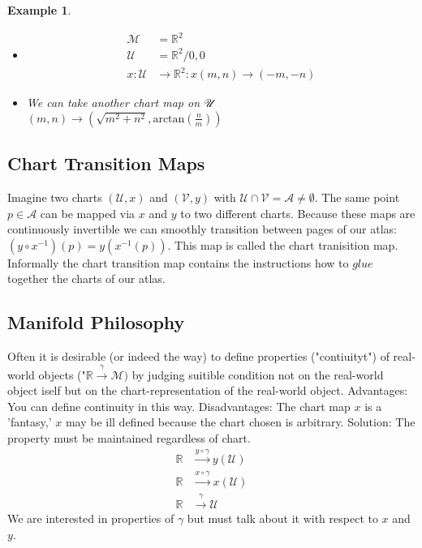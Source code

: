 \documentclass[10pt, oneside]{article}
\newcommand{\R}{\mathbb{R}}
\newcommand{\M}{\mathcal{M}}
\newtheorem{example}{Example}
\begin{document}
         \begin{example}
            \begin{itemize}
               \item \begin{align*}
                  \M &= \R^2 \\
                  \mathcal{U} &= \R^2 \slash {0,0} \\
                  x: \mathcal{U} &\to \R^2 : x(m,n) \to (-m,-n) 
               \end{align*}
               \item We can take another chart map on $\mathcal{U}\\$
            $(m,n) \to (\sqrt{m^2+n^2}, \text{arctan}(\frac{n}{m}))$
            \end{itemize}
         \end{example}
      \subsection*{Chart Transition Maps}
         Imagine two charts $(\mathcal{U},x)$ and $(\mathcal{V},y)$ with $\mathcal{U} \cap \mathcal{V} = \mathcal{A} \neq \emptyset$. The same point $p \in \mathcal{A}$ can be mapped via $x$ and $y$ to two different charts. 
         Because these maps are continuously invertible we can smoothly transition between pages of our atlas: $(y \circ x^{-1})(p) = y(x^{-1}(p))$. 
         This map is called the chart tranisition map. Informally the chart transition map contains the instructions how to $glue$ together the charts of our atlas. 
      \subsection*{Manifold Philosophy}
         Often it is desirable (or indeed the way) to define properties ("contiuityt") of real-world objects ("$\R \xrightarrow{\gamma}\M)$ by judging suitible condition not on the real-world object iself but on the chart-representation of the real-world object.
         Advantages: You can define continuity in this way.
         Disadvantages: The chart map $x$ is a 'fantasy,' $x$ may be ill defined because the chart chosen is arbitrary. 
         Solution: The property must be maintained regardless of chart. 
         \begin{align*}
         \R &\xrightarrow{y \circ \gamma} y(\mathcal{U}) \\
         \R &\xrightarrow{x \circ \gamma} x(\mathcal{U}) \\
         \R &\xrightarrow{\gamma} \mathcal{U}
         \end{align*}
         We are interested in properties of $\gamma$ but must talk about it with respect to $x$ and $y$.
\end{document}
